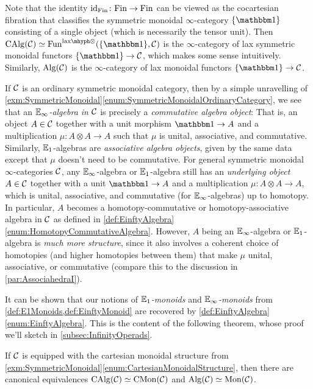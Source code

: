 \begin{numpar}
	Note that the identity $\operatorname{id}_{\mathrm{Fin}}\colon \mathrm{Fin}\rightarrow \mathrm{Fin}$ can be viewed as the cocartesian fibration that classifies the symmetric monoidal $\infty$-category $\{\IUnit\}$ consisting of a single object (which is necessarily the tensor unit). Then $\cat{CAlg}(\Cc)\simeq \Fun^{\lax}(\{\IUnit\},\Cc)$ is the $\infty$-category of lax symmetric monoidal functors $\{\IUnit\}\rightarrow \Cc$, which makes some sense intuitively. Similarly, $\mathrm{Alg}(\mathcal{C})$ is the $\infty$-category of lax monoidal functors $\{\IUnit\}\rightarrow \Cc$.
	
	If $\mathcal{C}$ is an ordinary symmetric monoidal category, then by a simple unravelling of \cref{exm:SymmetricMonoidal}\cref{enum:SymmetricMonoidalOrdinaryCategory}, we see that an \emph{$\mathbb{E}_\infty$-algebra in $\mathcal{C}$} is precisely a \emph{commutative algebra object}: That is, an object $A\in \mathcal{C}$ together with a unit morphism $\IUnit\rightarrow A$ and a multiplication $\mu\colon A\otimes A\rightarrow A$ such that $\mu$ is unital, associative, and commutative. Similarly, $\mathbb{E}_1$-algebras are \emph{associative algebra objects}, given by the same data except that $\mu$ doesn't need to be commutative. For general symmetric monoidal $\infty$-categories $\mathcal{C}$, any $\mathbb{E}_\infty$-algebra or $\mathbb{E}_1$-algebra still has an \emph{underlying object} $A\in \mathcal{C}$ together with a unit $\IUnit\rightarrow A$ and a multiplication $\mu\colon A\otimes A\rightarrow A$, which is unital, associative, and commutative (for $\mathbb{E}_\infty$-algebras) up to homotopy. In particular, $A$ becomes a homotopy-commutative or homotopy-associative algebra in $\mathcal{C}$ as defined in \cref{def:EinftyAlgebra}\cref{enum:HomotopyCommutativeAlgebra}. However, $A$ being an $\mathbb{E}_\infty$-algebra or $\mathbb{E}_1$-algebra is \emph{much more structure}, since it also involves a coherent choice of homotopies (and higher homotopies between them) that make $\mu$ unital, associative, or commutative (compare this to the discussion in \cref{par:AssociahedraI}). 
\end{numpar}
It can be shown that our notions of \emph{$\mathbb{E}_1$-monoids} and \emph{$\mathbb{E}_\infty$-monoids} from \cref{def:E1Monoids,def:EinftyMonoid} are recovered by \cref{def:EinftyAlgebra}\cref{enum:EinftyAlgebra}. This is the content of the following theorem, whose proof we'll sketch in \cref{subsec:InfinityOperads}.
\begin{thm}
	If $\mathcal{C}$ is equipped with the cartesian monoidal structure from \cref{exm:SymmetricMonoidal}\cref{enum:CartesianMonoidalStructure}, then there are canonical equivalences $\mathrm{CAlg}(\mathcal{C})\simeq \mathrm{CMon}(\mathcal{C})$ and $\mathrm{Alg}(\mathcal{C})\simeq \mathrm{Mon}(\mathcal{C})$.
\end{thm}


